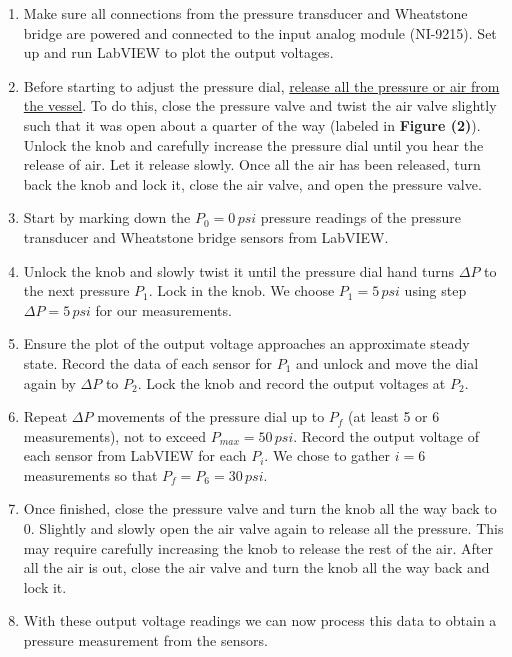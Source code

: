 \documentclass{article}
\begin{document}
\begin{enumerate}
    \item Make sure all connections from the pressure transducer and Wheatstone bridge are powered and connected to the input analog module (NI-9215). Set up and run LabVIEW to plot the output voltages.
    \item Before starting to adjust the pressure dial, \underline{release all the pressure or air from the vessel}. To do this, close the pressure valve and twist the air valve slightly such that it was open about a quarter of the way (labeled in \textbf{Figure (2)}). Unlock the knob and carefully increase the pressure dial until you hear the release of air. Let it release slowly. Once all the air has been released, turn back the knob and lock it, close the air valve, and open the pressure valve. 
    \item Start by marking down the $P_{0} = 0\, psi$ pressure readings of the pressure transducer and Wheatstone bridge sensors from LabVIEW. 
    \item Unlock the knob and slowly twist it until the pressure dial hand turns $\Delta P$ to the next pressure $P_{1}$. Lock in the knob. We choose $P_{1} = 5\, psi$ using step $\Delta P = 5\, psi$ for our measurements. 
    \item Ensure the plot of the output voltage approaches an approximate steady state. Record the data of each sensor for $P_{1}$ and unlock and move the dial again by $\Delta P$ to $P_{2}$. Lock the knob and record the output voltages at $P_{2}$. 
    \item Repeat $\Delta P$ movements of the pressure dial up to $P_{f}$ (at least 5 or 6 measurements), not to exceed $P_{max} = 50\, psi$. Record the output voltage of each sensor from LabVIEW for each $P_{i}$. We chose to gather $i=6$ measurements so that $P_{f} = P_{6} = 30\, psi$.
    \item Once finished, close the pressure valve and turn the knob all the way back to $0$. Slightly and slowly open the air valve again to release all the pressure. This may require carefully increasing the knob to release the rest of the air. After all the air is out, close the air valve and turn the knob all the way back and lock it. 
    \item With these output voltage readings we can now process this data to obtain a pressure measurement from the sensors.
    \end{enumerate}
\end{document}
